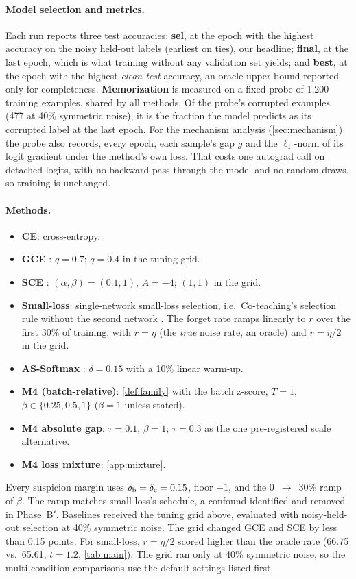 \paragraph{Model selection and metrics.}
Each run reports three test accuracies: \textbf{sel}, at the epoch with the highest accuracy on the
noisy held-out labels (earliest on ties), our headline; \textbf{final}, at the last epoch, which is
what training without any validation set yields; and \textbf{best}, at the epoch with the highest
\emph{clean test} accuracy, an oracle upper bound reported only for completeness.
\textbf{Memorization} is measured on a fixed probe of 1{,}200 training examples, shared by all
methods. Of the probe's corrupted examples (477 at 40\% symmetric noise), it is the fraction the
model predicts as its corrupted label at the last epoch. For the mechanism analysis
(\cref{sec:mechanism}) the probe also records, every epoch, each sample's gap $g$ and the
$\ell_1$-norm of its logit gradient under the method's own loss. That costs one autograd call on
detached logits, with no backward pass through the model and no random draws, so training is
unchanged.

\paragraph{Methods.}
\begin{itemize}
  \item \textbf{CE}: cross-entropy.
  \item \textbf{GCE} \citep{zhang2018gce}: $q = 0.7$; $q = 0.4$ in the tuning grid.
  \item \textbf{SCE} \citep{wang2019sce}: $(\alpha, \beta) = (0.1, 1)$, $A = -4$; $(1, 1)$ in the grid.
  \item \textbf{Small-loss}: single-network small-loss selection, i.e.\ Co-teaching's selection
  rule without the second network \citep{han2018coteaching}. The forget rate ramps linearly to $r$
  over the first 30\% of training, with $r = \eta$ (the \emph{true} noise rate, an oracle) and
  $r = \eta/2$ in the grid.
  \item \textbf{AS-Softmax} \citep{lv2023assoftmax}: $\delta = 0.15$ with a 10\% linear warm-up.
  \item \textbf{M4 (batch-relative)}: \cref{def:family} with the batch z-score, $T = 1$,
  $\beta \in \{0.25, 0.5, 1\}$ ($\beta = 1$ unless stated).
  \item \textbf{M4 absolute gap}: $\tau = 0.1$, $\beta = 1$; $\tau = 0.3$ as the one pre-registered
  scale alternative.
  \item \textbf{M4 loss mixture}: \cref{app:mixture}.
\end{itemize}
Every suspicion margin uses $\delta_{\mathrm{b}} = \delta_{\mathrm{c}} = 0.15$, floor $-1$, and the 0~$\to$~30\% ramp of
$\beta$. The ramp matches small-loss's schedule, a confound identified and removed in Phase~B$'$.
Baselines received the tuning grid above, evaluated with noisy-held-out selection at 40\%
symmetric noise. The grid changed GCE and SCE by less than 0.15 points. For small-loss,
$r = \eta/2$ scored higher than the oracle rate (66.75 vs.\ 65.61, $t = 1.2$, \cref{tab:main}).
The grid ran only at 40\% symmetric noise, so the multi-condition comparisons use the default
settings listed first.

